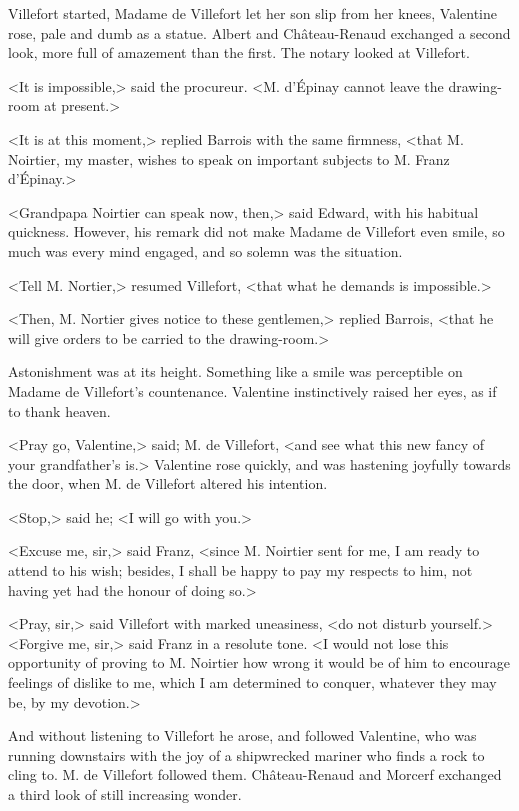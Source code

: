  Villefort started, Madame de Villefort let her son slip from her knees, Valentine rose, pale and dumb as a statue. Albert and Château-Renaud exchanged a second look, more full of amazement than the first. The notary looked at Villefort. 

 <It is impossible,> said the procureur. <M. d'Épinay cannot leave the drawing-room at present.> 

 <It is at this moment,> replied Barrois with the same firmness, <that M. Noirtier, my master, wishes to speak on important subjects to M. Franz d'Épinay.> 

 <Grandpapa Noirtier can speak now, then,> said Edward, with his habitual quickness. However, his remark did not make Madame de Villefort even smile, so much was every mind engaged, and so solemn was the situation. 

 <Tell M. Nortier,> resumed Villefort, <that what he demands is impossible.> 

 <Then, M. Nortier gives notice to these gentlemen,> replied Barrois, <that he will give orders to be carried to the drawing-room.> 

 Astonishment was at its height. Something like a smile was perceptible on Madame de Villefort's countenance. Valentine instinctively raised her eyes, as if to thank heaven. 

 <Pray go, Valentine,> said; M. de Villefort, <and see what this new fancy of your grandfather's is.> Valentine rose quickly, and was hastening joyfully towards the door, when M. de Villefort altered his intention. 

 <Stop,> said he; <I will go with you.> 

 <Excuse me, sir,> said Franz, <since M. Noirtier sent for me, I am ready to attend to his wish; besides, I shall be happy to pay my respects to him, not having yet had the honour of doing so.> 

 <Pray, sir,> said Villefort with marked uneasiness, <do not disturb yourself.>  <Forgive me, sir,> said Franz in a resolute tone. <I would not lose this opportunity of proving to M. Noirtier how wrong it would be of him to encourage feelings of dislike to me, which I am determined to conquer, whatever they may be, by my devotion.> 

 And without listening to Villefort he arose, and followed Valentine, who was running downstairs with the joy of a shipwrecked mariner who finds a rock to cling to. M. de Villefort followed them. Château-Renaud and Morcerf exchanged a third look of still increasing wonder. 